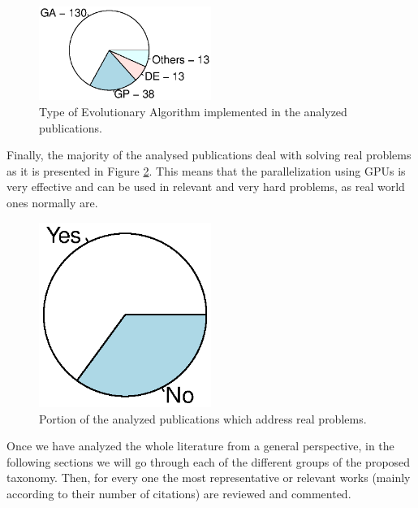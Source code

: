 \documentclass{article}
\begin{document}
\begin{figure}[!ht]
\centering
\includegraphics[clip,trim=16 64 16 64,width=0.5\textwidth]{algorithmtype.eps}
\caption{Type of Evolutionary Algorithm implemented in the analyzed publications.}
\label{figure:type_algorithm}
\end{figure}

Finally, the majority of the analysed publications deal with solving real problems as it is presented in Figure \ref{figure:type_problem}. This means that the parallelization using GPUs is very effective and can be used in relevant and very hard problems, as real world ones normally are.

\begin{figure}[!ht]
\centering
\includegraphics[clip,trim=16 64 16 64,width=0.5\textwidth]{realproblem.eps}
\caption{Portion of the analyzed publications which address real problems.}
\label{figure:type_problem}
\end{figure}


Once we have analyzed the whole literature from a general perspective, in the following sections we will go through each of the different groups of the proposed taxonomy. Then, for every one the most representative or relevant works (mainly according to their number of citations) are reviewed and commented.

\end{document}
